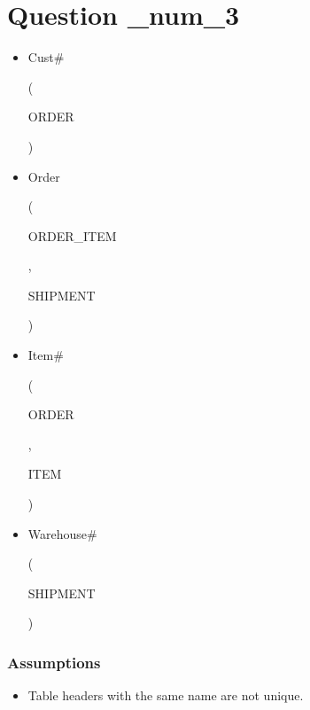 \documentclass{article}
\begin{document}
\section*{Question \_num_3}
\begin{itemize}
    \item \begin{verb} Cust# \end{verb} (\begin{verb} ORDER \end{verb})
    \item \begin{verb} Order \end{verb} (\begin{verb} ORDER_ITEM \end{verb}, \begin{verb} SHIPMENT \end{verb})
    \item \begin{verb} Item# \end{verb} (\begin{verb} ORDER \end{verb}, \begin{verb} ITEM \end{verb})
    \item \begin{verb} Warehouse# \end{verb} (\begin{verb} SHIPMENT \end{verb})
\end{itemize}

\subsubsection*{Assumptions}
\begin{itemize}
    \item Table headers with the same name are not unique.
\end{itemize}
\end{document}
